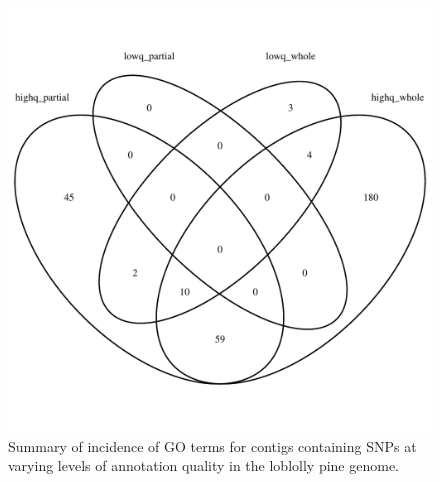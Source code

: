\documentclass[smallextended]{svjour3}
\begin{document}
\begin{figure}[ht]
\centering
\includegraphics[width=1.0\textwidth]{snp_venn}
\caption{Summary of incidence of GO terms for contigs containing SNPs at varying 
levels of annotation quality in the loblolly pine genome.}
\label{f:snp_venn}
\end{figure}

\clearpage
\end{document}
